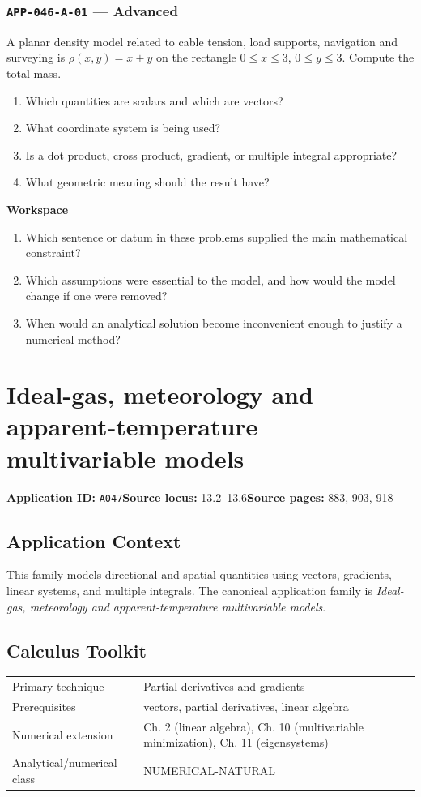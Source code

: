 \documentclass[11pt]{book}
\newcommand{\pid}[1]{\texttt{#1}}
\newcommand{\workspace}{\par\vspace{0.7in}\hrulefill\par\vspace{0.55in}\hrulefill\par}
\begin{document}
\subsection*{\pid{APP-046-A-01} — Advanced}
\begin{problembox}
A planar density model related to cable tension, load supports, navigation and surveying is $\rho(x,y)=x+y$ on the rectangle $0\le x\le 3$, $0\le y\le 3$. Compute the total mass.
\end{problembox}
\begin{promptbox}\begin{enumerate}
\item Which quantities are scalars and which are vectors?
\item What coordinate system is being used?
\item Is a dot product, cross product, gradient, or multiple integral appropriate?
\item What geometric meaning should the result have?
\end{enumerate}\end{promptbox}
\textbf{Workspace}\workspace
\begin{reflectionbox}\begin{enumerate}
\item Which sentence or datum in these problems supplied the main mathematical constraint?
\item Which assumptions were essential to the model, and how would the model change if one were removed?
\item When would an analytical solution become inconvenient enough to justify a numerical method?
\end{enumerate}\end{reflectionbox}
\chapter{Ideal-gas, meteorology and apparent-temperature multivariable models}\label{app:A047}
\textbf{Application ID:} \pid{A047}\quad \textbf{Source locus:} 13.2–13.6\quad \textbf{Source pages:} 883, 903, 918
\section*{Application Context}
This family models directional and spatial quantities using vectors, gradients, linear systems, and multiple integrals. The canonical application family is \emph{Ideal-gas, meteorology and apparent-temperature multivariable models}.
\section*{Calculus Toolkit}
\begin{tabularx}{\textwidth}{@{}lX@{}}\toprule
Primary technique & Partial derivatives and gradients \\
Prerequisites & vectors, partial derivatives, linear algebra \\
Numerical extension & Ch. 2 (linear algebra), Ch. 10 (multivariable minimization), Ch. 11 (eigensystems) \\
Analytical/numerical class & NUMERICAL-NATURAL \\
\bottomrule\end{tabularx}
\end{document}
